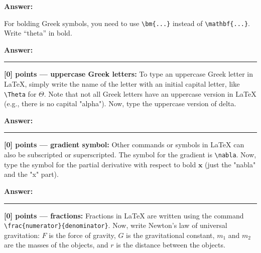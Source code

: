 \documentclass{article}
\newcommand{\mydivider}{\vspace{1em}\hrule\vspace{1em}}
\begin{document}
\begin{tcolorbox}{}
\textbf{Answer: }


\end{tcolorbox}

For bolding Greek symbols, you need to use \verb|\bm{...}| instead of \verb|\mathbf{...}|.  Write ``theta'' in bold.

\begin{tcolorbox}{}
\textbf{Answer: }


\end{tcolorbox}

\mydivider

\noindent\textbf{[0] points --- uppercase Greek letters:} To type an uppercase Greek letter in LaTeX, simply write the name of the letter with an initial capital letter, like \verb|\Theta| for $\Theta$. Note that not all Greek letters have an uppercase version in LaTeX (e.g., there is no capital "alpha"). Now, type the uppercase version of delta.

\begin{tcolorbox}{}
\textbf{Answer: }


\end{tcolorbox}


\mydivider

\noindent\textbf{[0] points --- gradient symbol:} Other commands or symbols in LaTeX can also be subscripted or superscripted. The symbol for the gradient is \verb|\nabla|. Now, type the symbol for the partial derivative with respect to bold $\mathbf{x}$ (just the "nabla" and the "x" part).

\begin{tcolorbox}{}
\textbf{Answer: }


\end{tcolorbox}


\mydivider

\noindent\textbf{[0] points --- fractions:} Fractions in LaTeX are written using the command \verb|\frac{numerator}{denominator}|. Now, write Newton's law of universal gravitation:
$F$ is the force of gravity, $G$ is the gravitational constant, $m_1$ and $m_2$ are the masses of the objects, and $r$ is the distance between the objects.
\end{document}
